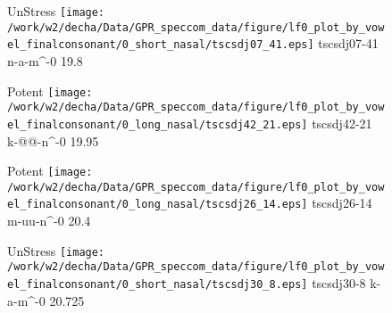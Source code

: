 \documentclass{article}
\begin{document}
\begin{figure}[t]
\begin{minipage}[b]{.24\textwidth}
UnStress
\centering
\texttt{[image: /work/w2/decha/Data/GPR\_speccom\_data/figure/lf0\_plot\_by\_vowel\_finalconsonant/0\_short\_nasal/tscsdj07\_41.eps]}
tscsdj07-41 n-a-m\textasciicircum-0 19.8
\end{minipage}
\begin{minipage}[b]{.24\textwidth}
\colorbox{Apricot}{Potent}
\centering
\texttt{[image: /work/w2/decha/Data/GPR\_speccom\_data/figure/lf0\_plot\_by\_vowel\_finalconsonant/0\_long\_nasal/tscsdj42\_21.eps]}
tscsdj42-21 k-@@-n\textasciicircum-0 19.95
\end{minipage}
\begin{minipage}[b]{.24\textwidth}
\colorbox{Apricot}{Potent}
\centering
\texttt{[image: /work/w2/decha/Data/GPR\_speccom\_data/figure/lf0\_plot\_by\_vowel\_finalconsonant/0\_long\_nasal/tscsdj26\_14.eps]}
tscsdj26-14 m-uu-n\textasciicircum-0 20.4
\end{minipage}
\begin{minipage}[b]{.24\textwidth}
UnStress
\centering
\texttt{[image: /work/w2/decha/Data/GPR\_speccom\_data/figure/lf0\_plot\_by\_vowel\_finalconsonant/0\_short\_nasal/tscsdj30\_8.eps]}
tscsdj30-8 k-a-m\textasciicircum-0 20.725
\end{minipage}
\end{figure}
\end{document}
